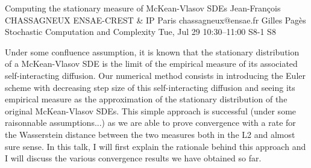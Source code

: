 \begin{talk}
  {Computing the stationary measure of McKean-Vlasov SDEs}%
  {Jean-Fran\c{c}ois CHASSAGNEUX}%
  {ENSAE-CREST \& IP Paris}%
  {chassagneux@ensae.fr}%
  {Gilles Pag\`es}%
  {Stochastic Computation and Complexity}%
  {Tue, Jul 29 10:30–11:00}%
  {S8-1}%
  {S8}%
				
			
Under some confluence assumption, it is known that the stationary distribution of a McKean-Vlasov SDE is the limit of the empirical measure of its associated self-interacting diffusion. 
Our numerical method consists in introducing the Euler scheme with decreasing step size of this self-interacting diffusion and seeing its empirical measure as the approximation of the stationary distribution of the original McKean-Vlasov SDEs.
This simple approach is successful (under some raisonnable assumptions...) as we are able to prove convergence with a rate for the Wasserstein distance between the two measures both in the L2 and almost sure sense. In this talk, I will first explain the rationale behind this approach and  I will discuss the various convergence results we have obtained so far.





\end{talk}

